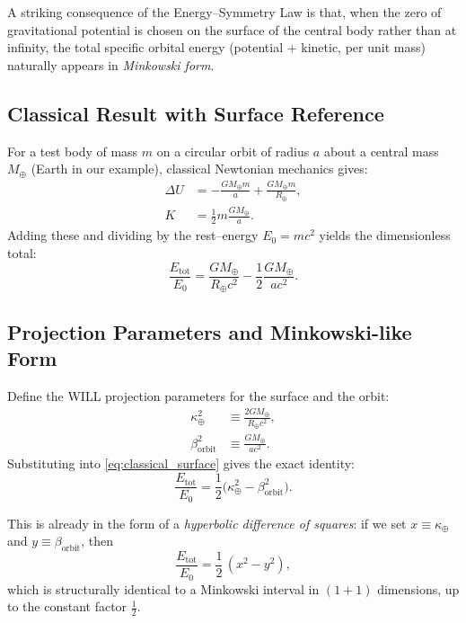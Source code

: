 \documentclass[12pt, a4paper]{article}
\begin{document}
A striking consequence of the Energy--Symmetry Law is that, when the
zero of gravitational potential is chosen on the surface of the central body
rather than at infinity, the total specific orbital energy (potential $+$ kinetic,
per unit mass) naturally appears in \emph{Minkowski form}.

\subsection{Classical Result with Surface Reference}

For a test body of mass $m$ on a circular orbit of radius $a$ about
a central mass $M_\oplus$ (Earth in our example),
classical Newtonian mechanics gives:
\begin{align}
\Delta U &= -\frac{GM_\oplus m}{a} + \frac{GM_\oplus m}{R_\oplus},\\
K &= \frac12 m\frac{GM_\oplus}{a}.
\end{align}
Adding these and dividing by the rest--energy $E_0 = m c^2$ yields
the dimensionless total:
\begin{equation}
\frac{E_{\text{tot}}}{E_0}
= \frac{GM_\oplus}{R_\oplus c^2}
 - \frac12\frac{GM_\oplus}{a c^2}.
\label{eq:classical_surface}
\end{equation}

\subsection{Projection Parameters and Minkowski-like Form}

Define the WILL projection parameters for the surface and the orbit:
\begin{align}
\kappa_\oplus^2 &\equiv \frac{2GM_\oplus}{R_\oplus c^2},\\
\beta_{\text{orbit}}^2 &\equiv \frac{GM_\oplus}{a c^2}.
\end{align}
Substituting into \eqref{eq:classical_surface} gives the exact identity:
\begin{equation}
\frac{E_{\text{tot}}}{E_0}
= \frac12\bigl(\kappa_\oplus^2 - \beta_{\text{orbit}}^2\bigr).
\label{eq:will_minkowski_energy}
\end{equation}

This is already in the form of a \emph{hyperbolic difference of squares}:
if we set $x \equiv \kappa_\oplus$ and $y \equiv \beta_{\text{orbit}}$, then
\begin{equation}
\frac{E_{\text{tot}}}{E_0} = \frac12\,(x^2 - y^2),
\end{equation}
which is structurally identical to a Minkowski interval in $(1+1)$ dimensions,
up to the constant factor $\frac12$.
\end{document}
